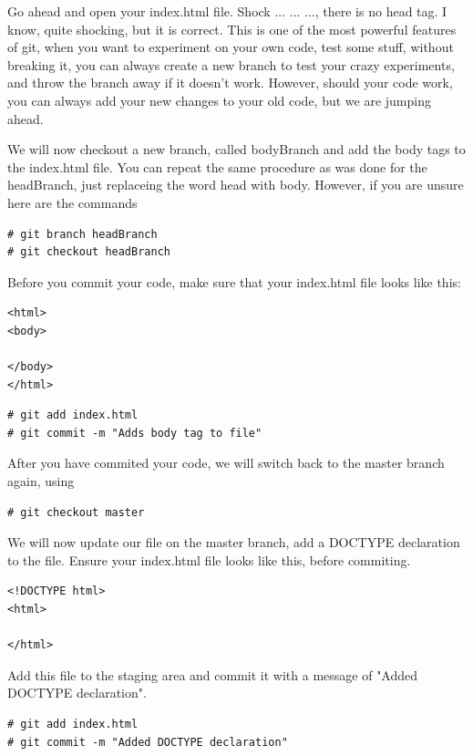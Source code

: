 \documentclass[a4paper,10pt]{article}
\begin{document}
Go ahead and open your index.html file. Shock ... ... ..., there is no head tag. I know, quite shocking, but it is correct. This is one of the most powerful features of git, when you want to experiment on your own code, test some stuff, without breaking it, you can always create a new branch to test your crazy experiments, and throw the branch away if it doesn't work. However, should your code work, you can always add your new changes to your old code, but we are jumping ahead.

We will now checkout a new branch, called bodyBranch and add the body tags to the index.html file. You can repeat the same procedure as was done for the headBranch, just replaceing the word head with body. However, if you are unsure here are the commands
\begin{lstlisting}[style=TerminalStyle]
# git branch headBranch
# git checkout headBranch
\end{lstlisting}

 Before you commit your code, make sure that your index.html file looks like this:
\begin{lstlisting}[style=HtmlStyle]
<html>
<body>

</body>
</html> 
\end{lstlisting}

\begin{lstlisting}[style=TerminalStyle]
# git add index.html
# git commit -m "Adds body tag to file"
\end{lstlisting}

After you have commited your code, we will switch back to the master branch again, using 
\begin{lstlisting}[style=TerminalStyle]
# git checkout master
\end{lstlisting}

We will now update our file on the master branch, add a DOCTYPE declaration to the file. Ensure your index.html file looks like this, before commiting.
\begin{lstlisting}[style=HtmlStyle]
<!DOCTYPE html>
<html>

</html> 
\end{lstlisting}

Add this file to the staging area and commit it with a message of "Added DOCTYPE declaration".
\begin{lstlisting}[style=TerminalStyle]
# git add index.html
# git commit -m "Added DOCTYPE declaration"
\end{lstlisting}
\end{document}
